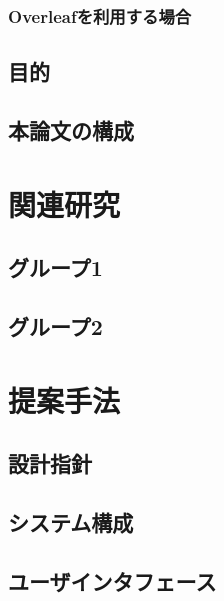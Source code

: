 \documentclass[12pt,a4j]{jreport}
\begin{document}
\subsection{Overleafを利用する場合}


\section{目的}



\section{本論文の構成}



\chapter{関連研究}

\section{グループ1}

\section{グループ2}




\chapter{提案手法}

\section{設計指針}

\section{システム構成}

\section{ユーザインタフェース}
\end{document}
